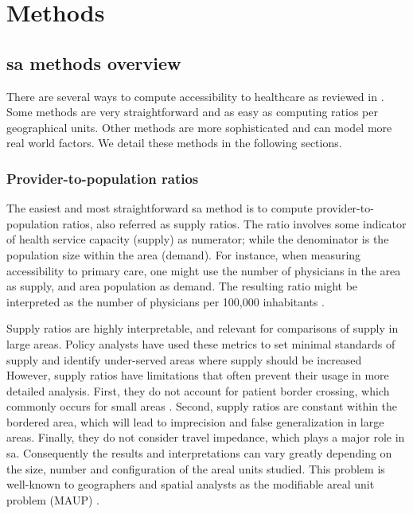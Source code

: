 \section{Methods}

\subsection{\acl{sa} methods overview}

There are several ways to compute accessibility to healthcare as reviewed in
\cite{guagliardo_spatial_2004}. Some methods are very straightforward and as
easy as computing ratios per geographical units. Other methods are more
sophisticated and can model more real world factors. We detail these methods in
the following sections.

\subsubsection{Provider-to-population ratios}

The easiest and most straightforward \ac{sa} method is to compute
provider-to-population ratios, also referred as supply ratios. The ratio
involves some indicator of health service capacity (supply) as numerator; while
the denominator is the population size within the area (demand). For instance,
when measuring accessibility to primary care, one might use the number of
physicians in the area as supply, and area population as demand. The resulting
ratio might be interpreted as the number of physicians per 100,000 inhabitants
\cite{schonfeld_numbers_1972}.

Supply ratios are highly interpretable, and relevant for comparisons of supply
in large areas. Policy analysts have used these metrics to set minimal standards
of supply and identify under-served areas where supply should be increased
\cite{schonfeld_numbers_1972,council_on_graduate_medical_education_physician_1998,connor_competition_1995}%
However, supply ratios have limitations that often prevent their usage in more
detailed analysis. First, they do not account for patient border crossing, which
commonly occurs for small areas
\cite{connor_measuring_1994,basu_border-crossing_1996,basu_medicare_1995,holahan_border_1993}.
Second, supply ratios are constant within the bordered area, which will lead to
imprecision and false generalization in large areas. Finally, they do not
consider travel impedance, which plays a major role in \ac{sa}. Consequently the
results and interpretations can vary greatly depending on the size, number and
configuration of the areal units studied. This problem is well-known to
geographers and spatial analysts as the modifiable areal unit problem (MAUP)
\cite{openshaw_modifiable_1983}.


